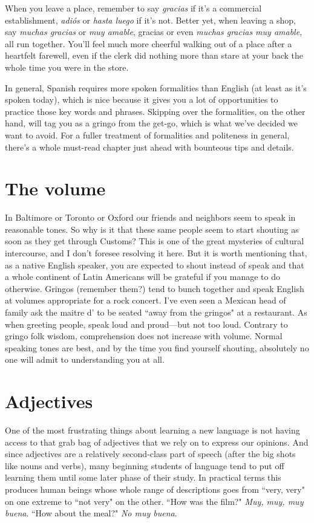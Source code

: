 When you leave a place, remember to say \emph{gracias} if it's a commercial establishment, \emph{adiós} or \emph{hasta luego} if it's not. Better yet,
when leaving a shop, say \emph{muchas gracias} or \emph{muy amable}, gracias or
even \emph{muchas gracias muy amable}, all run together. You'll feel much
more cheerful walking out of a place after a heartfelt farewell, even if
the clerk did nothing more than stare at your back the whole time you
were in the store.

In general, Spanish requires more spoken formalities than English (at least as it's spoken today), which is nice because it gives you a
lot of opportunities to practice those key words and phrases. Skipping
over the formalities, on the other hand, will tag you as a gringo from
the get-go, which is what we've decided we want to avoid. For a fuller
treatment of formalities and politeness in general, there's a whole
must-read chapter just ahead with bounteous tips and details.

\section{The volume}

In Baltimore or Toronto or Oxford our friends and neighbors
seem to speak in reasonable tones. So why is it that these same people
seem to start shouting as soon as they get through Customs? This is
one of the great mysteries of cultural intercourse, and I don't foresee
resolving it here. But it is worth mentioning that, as a native English
speaker, you are expected to shout instead of speak and that a whole
continent of Latin Americans will be grateful if you manage to do otherwise. Gringos (remember them?) tend to bunch together and speak
English at volumes appropriate for a rock concert. I've even seen a
Mexican head of family ask the maitre d' to be seated ``away from the
gringos" at a restaurant. As when greeting people, speak loud and
proud---but not too loud. Contrary to gringo folk wisdom, comprehension does not increase with volume. Normal speaking tones are best,
and by the time you find yourself shouting, absolutely no one will admit to understanding you at all.

\section{Adjectives}

One of the most frustrating things about learning a new language is not having access to that grab bag of adjectives that we rely on
to express our opinions. And since adjectives are a relatively second-class part of speech (after the big shots like nouns and verbs), many
beginning students of language tend to put off learning them until
some later phase of their study. In practical terms this produces human
beings whose whole range of descriptions goes from ``very, very" on
one extreme to ``not very" on the other. ``How was the film?" \emph{Muy,
muy, muy buena}. ``How about the meal?" \emph{No muy buena}.

